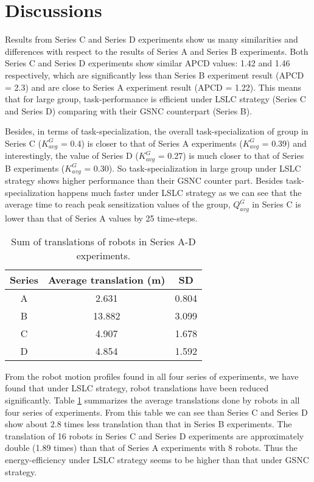 \section{Discussions}
\label{local-comm:discuss}
Results from Series C and Series D experiments show us many similarities and differences with respect to the results of Series A and Series B experiments. Both Series C and Series D experiments show similar APCD values: 1.42 and 1.46 respectively, which are significantly less than Series B experiment result (APCD = 2.3) and are close to Series A experiment result (APCD = 1.22). This means that for large group, task-performance  is efficient under LSLC strategy (Series C and Series D) comparing with their GSNC counterpart (Series B).

Besides, in terms of task-specialization, the overall task-specialization of group in Series C ($K^G_{avg}$ = 0.4) is  closer to that of Series A experiments ($K^G_{avg}$ = 0.39) and interestingly, the value of  Series D ($K^G_{avg}$ = 0.27) is  much closer to that of Series B experiments ($K^G_{avg}$ = 0.30). So task-specialization in large group under LSLC strategy shows higher performance than their GSNC counter part. Besides task-specialization happens much faster under LSLC strategy as we can see that the average time to reach peak sensitization values  of the group,  $Q^G_{avg}$ in Series C is lower than that of Series A values by 25 time-steps.

\begin{table}
\begin{center}
\caption{Sum of translations of robots in Series A-D experiments.}
\begin{tabular}{|c|c|c|}
\hline \textbf{Series} & \textbf{Average translation (m)} & \textbf{SD} \\ 
\hline A & 2.631 & 0.804\\ 
\hline B & 13.882 & 3.099\\
\hline C & 4.907 & 1.678\\
\hline D & 4.854 & 1.592\\
\hline
\end{tabular}
\label{table:motion-cmp} 
\end{center}
\end{table}
From the robot motion profiles found in all four series of experiments, we have found that under LSLC strategy, robot translations have been reduced significantly. Table \ref{table:motion-cmp} summarizes the average translations done by robots in all four series of experiments. From this table we can see than Series C and Series D show about 2.8 times less translation than that in Series B experiments. The translation of 16 robots in Series C and Series D experiments are approximately double (1.89 times) than that of Series A experiments with 8 robots.  Thus the energy-efficiency under LSLC strategy seems to be higher  than that under GSNC strategy.

